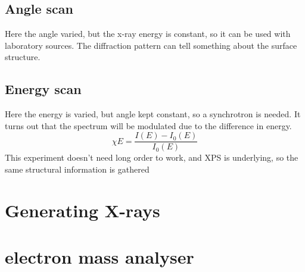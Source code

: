 \documentclass[article,oneside]{memoir}
\begin{document}
\section{Angle scan}
Here the angle varied, but the x-ray energy is constant, so it can be used with laboratory sources. The diffraction pattern can tell something about the surface structure.

\section{Energy scan}
Here the energy is varied, but angle kept constant, so a synchrotron is needed. It turns out that the spectrum will be modulated due to the difference in energy.
\begin{equation*}
        \chi{E}= \frac{I(E)-I_{0}(E)}{I_{0}(E)}
\end{equation*}
This experiment doesn't need long order to work, and XPS is underlying, so the same structural information is gathered

\chapter{Generating X-rays}

\chapter{electron mass analyser}
\end{document}

